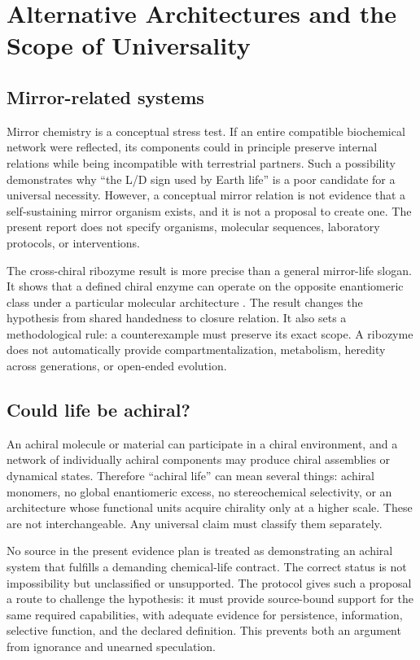 \documentclass[conference]{IEEEtran}
\begin{document}
\section{Alternative Architectures and the Scope of Universality}

\subsection{Mirror-related systems}

Mirror chemistry is a conceptual stress test. If an entire compatible biochemical network were reflected, its components could in principle preserve internal relations while being incompatible with terrestrial partners. Such a possibility demonstrates why ``the L/D sign used by Earth life'' is a poor candidate for a universal necessity. However, a conceptual mirror relation is not evidence that a self-sustaining mirror organism exists, and it is not a proposal to create one. The present report does not specify organisms, molecular sequences, laboratory protocols, or interventions.

The cross-chiral ribozyme result is more precise than a general mirror-life slogan. It shows that a defined chiral enzyme can operate on the opposite enantiomeric class under a particular molecular architecture \cite{sczepanski}. The result changes the hypothesis from shared handedness to closure relation. It also sets a methodological rule: a counterexample must preserve its exact scope. A ribozyme does not automatically provide compartmentalization, metabolism, heredity across generations, or open-ended evolution.

\subsection{Could life be achiral?}

An achiral molecule or material can participate in a chiral environment, and a network of individually achiral components may produce chiral assemblies or dynamical states. Therefore ``achiral life'' can mean several things: achiral monomers, no global enantiomeric excess, no stereochemical selectivity, or an architecture whose functional units acquire chirality only at a higher scale. These are not interchangeable. Any universal claim must classify them separately.

No source in the present evidence plan is treated as demonstrating an achiral system that fulfills a demanding chemical-life contract. The correct status is not impossibility but unclassified or unsupported. The protocol gives such a proposal a route to challenge the hypothesis: it must provide source-bound support for the same required capabilities, with adequate evidence for persistence, information, selective function, and the declared definition. This prevents both an argument from ignorance and unearned speculation.
\end{document}
